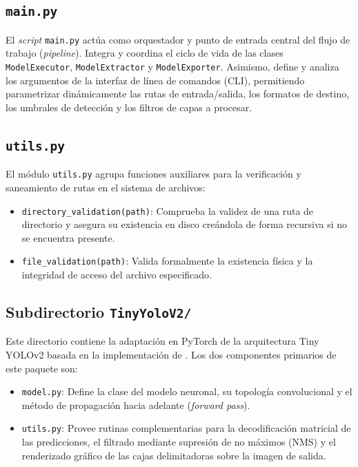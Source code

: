 \subsection{\texttt{main.py}}
El \textit{script} \texttt{main.py} actúa como orquestador y punto de entrada central del flujo de trabajo 
(\textit{pipeline}). Integra y coordina el ciclo de vida de las clases \texttt{ModelExecutor}, \texttt{ModelExtractor} y 
\texttt{ModelExporter}. Asimismo, define y analiza los argumentos de la interfaz de línea de comandos (CLI), permitiendo 
parametrizar dinámicamente las rutas de entrada/salida, los formatos de destino, los umbrales de detección y los filtros 
de capas a procesar.

\subsection{\texttt{utils.py}}
El módulo \texttt{utils.py} agrupa funciones auxiliares para la verificación y saneamiento de rutas en el sistema de archivos:
\begin{itemize}
    \item \texttt{directory\_validation(path)}: Comprueba la validez de una ruta de directorio y asegura su existencia en disco creándola 
    de forma recursiva si no se encuentra presente.
    \item \texttt{file\_validation(path)}: Valida formalmente la existencia física y la integridad de acceso del archivo especificado.
\end{itemize}

\subsection{Subdirectorio \texttt{TinyYoloV2/}}
Este directorio contiene la adaptación en PyTorch de la arquitectura Tiny YOLOv2 basada en la implementación de \parencite{yolov2_implementation}. 
Los dos componentes primarios de este paquete son:
\begin{itemize}
    \item \texttt{model.py}: Define la clase del modelo neuronal, su topología convolucional y el método de propagación hacia adelante (\textit{forward pass}).
    \item \texttt{utils.py}: Provee rutinas complementarias para la decodificación matricial de las predicciones, el filtrado mediante supresión 
    de no máximos (NMS) y el renderizado gráfico de las cajas delimitadoras sobre la imagen de salida.
\end{itemize}

